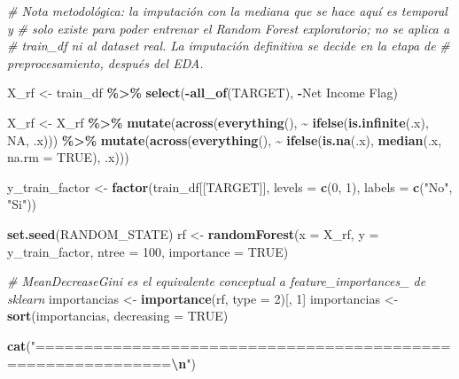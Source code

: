 \documentclass[
]{book}
\newenvironment{Shaded}{\begin{snugshade}}{\end{snugshade}}
\newcommand{\AttributeTok}[1]{\textcolor[rgb]{0.13,0.29,0.53}{#1}}
\newcommand{\CommentTok}[1]{\textcolor[rgb]{0.56,0.35,0.01}{\textit{#1}}}
\newcommand{\ConstantTok}[1]{\textcolor[rgb]{0.56,0.35,0.01}{#1}}
\newcommand{\DecValTok}[1]{\textcolor[rgb]{0.00,0.00,0.81}{#1}}
\newcommand{\FunctionTok}[1]{\textcolor[rgb]{0.13,0.29,0.53}{\textbf{#1}}}
\newcommand{\NormalTok}[1]{#1}
\newcommand{\OtherTok}[1]{\textcolor[rgb]{0.56,0.35,0.01}{#1}}
\newcommand{\SpecialCharTok}[1]{\textcolor[rgb]{0.81,0.36,0.00}{\textbf{#1}}}
\newcommand{\StringTok}[1]{\textcolor[rgb]{0.31,0.60,0.02}{#1}}
\begin{document}
\begin{Shaded}
\begin{Highlighting}[]
\CommentTok{\# Nota metodológica: la imputación con la mediana que se hace aquí es temporal y}
\CommentTok{\# solo existe para poder entrenar el Random Forest exploratorio; no se aplica a}
\CommentTok{\# train\_df ni al dataset real. La imputación definitiva se decide en la etapa de}
\CommentTok{\# preprocesamiento, después del EDA.}

\NormalTok{X\_rf }\OtherTok{\textless{}{-}}\NormalTok{ train\_df }\SpecialCharTok{\%\textgreater{}\%} \FunctionTok{select}\NormalTok{(}\SpecialCharTok{{-}}\FunctionTok{all\_of}\NormalTok{(TARGET), }\SpecialCharTok{{-}}\StringTok{\textasciigrave{}}\AttributeTok{Net Income Flag}\StringTok{\textasciigrave{}}\NormalTok{)}

\NormalTok{X\_rf }\OtherTok{\textless{}{-}}\NormalTok{ X\_rf }\SpecialCharTok{\%\textgreater{}\%}
  \FunctionTok{mutate}\NormalTok{(}\FunctionTok{across}\NormalTok{(}\FunctionTok{everything}\NormalTok{(), }\SpecialCharTok{\textasciitilde{}} \FunctionTok{ifelse}\NormalTok{(}\FunctionTok{is.infinite}\NormalTok{(.x), }\ConstantTok{NA}\NormalTok{, .x))) }\SpecialCharTok{\%\textgreater{}\%}
  \FunctionTok{mutate}\NormalTok{(}\FunctionTok{across}\NormalTok{(}\FunctionTok{everything}\NormalTok{(), }\SpecialCharTok{\textasciitilde{}} \FunctionTok{ifelse}\NormalTok{(}\FunctionTok{is.na}\NormalTok{(.x), }\FunctionTok{median}\NormalTok{(.x, }\AttributeTok{na.rm =} \ConstantTok{TRUE}\NormalTok{), .x)))}

\NormalTok{y\_train\_factor }\OtherTok{\textless{}{-}} \FunctionTok{factor}\NormalTok{(train\_df[[TARGET]], }\AttributeTok{levels =} \FunctionTok{c}\NormalTok{(}\DecValTok{0}\NormalTok{, }\DecValTok{1}\NormalTok{),}
                          \AttributeTok{labels =} \FunctionTok{c}\NormalTok{(}\StringTok{"No"}\NormalTok{, }\StringTok{"Si"}\NormalTok{))}

\FunctionTok{set.seed}\NormalTok{(RANDOM\_STATE)}
\NormalTok{rf }\OtherTok{\textless{}{-}} \FunctionTok{randomForest}\NormalTok{(}\AttributeTok{x =}\NormalTok{ X\_rf, }\AttributeTok{y =}\NormalTok{ y\_train\_factor, }\AttributeTok{ntree =} \DecValTok{100}\NormalTok{, }\AttributeTok{importance =} \ConstantTok{TRUE}\NormalTok{)}

\CommentTok{\# MeanDecreaseGini es el equivalente conceptual a feature\_importances\_ de sklearn}
\NormalTok{importancias }\OtherTok{\textless{}{-}} \FunctionTok{importance}\NormalTok{(rf, }\AttributeTok{type =} \DecValTok{2}\NormalTok{)[, }\DecValTok{1}\NormalTok{]}
\NormalTok{importancias }\OtherTok{\textless{}{-}} \FunctionTok{sort}\NormalTok{(importancias, }\AttributeTok{decreasing =} \ConstantTok{TRUE}\NormalTok{)}

\FunctionTok{cat}\NormalTok{(}\StringTok{"============================================================}\SpecialCharTok{\textbackslash{}n}\StringTok{"}\NormalTok{)}
\end{Highlighting}
\end{Shaded}
\end{document}
